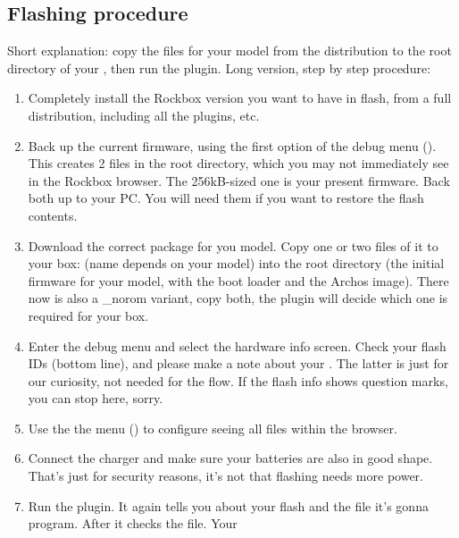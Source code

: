\subsection{Flashing procedure}
Short explanation: copy the  files for your model from the
distribution to the root directory of your \dap, then run the 
 plugin.
Long version, step by step procedure:
\begin{enumerate}
\item Completely install the Rockbox version you want to have in flash, from a 
  full  distribution, including all the plugins, etc.
\item Back up the current firmware, using the first option of the debug menu 
  ().
  This creates 2 files in the root directory, which you may not immediately see 
  in the Rockbox browser. The 256kB-sized  one is your present firmware. Back  both up to your PC. You will need them if 
  you want to restore the flash contents.
\item Download the correct package for you model. Copy one or two files of it to 
  your box:  (name depends on your model) into the root 
  directory (the initial firmware for your model, with the boot loader and the 
  Archos image). There now is also a \_norom variant, copy both, the plugin will 
  decide which one is required for your box.
\item Enter the debug menu and select the hardware info screen. Check your flash 
  IDs (bottom line), and please make a note about your . The latter is just for our 
  curiosity, not needed for the flow. If the flash info shows question  marks, 
  you can stop here, sorry.
\item Use the the menu () to 
  configure seeing all files within the browser.
\item Connect the charger and make sure your batteries are also in good shape. 
  That's just for security reasons, it's not that flashing needs more power.
\item Run the  plugin. It again tells you about your 
  flash and the file it's gonna program. After  it checks the file. Your 

\end{enumerate}
